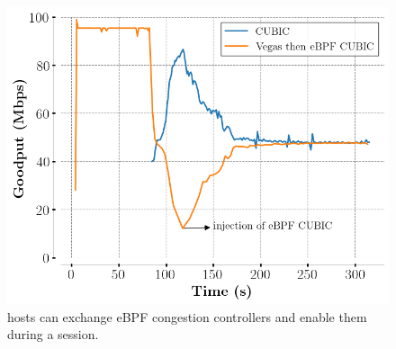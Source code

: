 \begin{figure}[!t]
  \begin{center}
    \includegraphics[width=0.8\columnwidth]{figures/vegas_cubic.png}
  \end{center}
  \caption{\tcpls hosts can exchange eBPF congestion controllers and enable
  them during a \tcpls session.}
  \label{fig:vegasCubic}
\end{figure}

